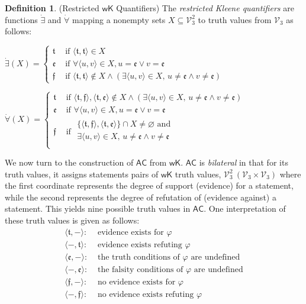 \documentclass[letterpaper]{article} %
\theoremstyle{definition}
\theoremstyle{definition}
\newtheorem{definition}{Definition}
\theoremstyle{definition}
\theoremstyle{definition}
\theoremstyle{definition}
\newcommand{\vt}{\mathfrak{t}}
\newcommand{\vf}{\mathfrak{f}}
\newcommand{\vu}{\mathfrak{e}}
\begin{document}
\begin{definition}(Restricted $\mathsf{wK}$ Quantifiers)
    The \emph{restricted Kleene quantifiers} are functions $\dot{\exists}$ and $\dot{\forall}$ mapping a nonempty sets $X\subseteq\mathcal{V}_{3}^{2}$ to truth values from $\mathcal{V}_{3}$ as follows:
	
	\vspace{.1cm}

    {\small
	
	\noindent $\dot{\exists}(X)=\begin{cases}
	\vt & \mbox{ if }\langle\vt,\vt\rangle\in X\\
	\vu & \mbox{ if }\forall\langle u,v\rangle\in X, u=\vu\lor v=\vu\\
	\vf & \mbox{ if }\langle\vt,\vt\rangle\notin X \land (\exists \langle u,v\rangle\in X\mbox{, }u\neq\vu\land v\neq\vu)
	\end{cases}$

    	\noindent $\dot{\forall}(X)=\begin{cases}
	\vt & \mbox{ if }\langle\vt,\vf\rangle,\langle\vt,\vu\rangle\notin X \land (\exists \langle u,v\rangle\in X\mbox{, }u\neq\vu\land v\neq\vu)\\
	\vu & \mbox{ if } \forall\langle u,v\rangle\in X,u=\vu\lor v=\vu\\
	\vf & \mbox{ if }
    \begin{aligned}
    \lbrace\langle\vt,\vf\rangle,\langle\vt,\vu\rangle\rbrace\cap X\neq\varnothing \mbox{ and }\\ \exists \langle u,v\rangle\in X\mbox{, }u\neq\vu\land v\neq\vu\\
    \end{aligned}
	\end{cases}$
    }
\end{definition}
\noindent We now turn to the construction of $\mathsf{AC}$ from $\mathsf{wK}$. $\mathsf{AC}$ is \textit{bilateral} in that for its truth values, it assigns statements pairs of $\mathsf{wK}$ truth values, $\mathcal{V}^2_3 \: (\mathcal{V}_3 \times \mathcal{V}_3)$ where the first coordinate represents the degree of support (evidence) for a statement, while the second represents the degree of refutation of (evidence against) a statement. This yields nine possible truth values in $\mathsf{AC}$. One interpretation of these truth values is given as follows:
\begin{align*} \langle\vt,-\rangle: & \text{ evidence exists for } \varphi \\ 
\langle -,\vt\rangle: & \text{ evidence exists refuting } \varphi \\ 
\langle\vu,-\rangle: & \text{ the truth conditions of } \varphi \text{ are undefined} \\
\langle -,\vu\rangle: & \text{ the falsity conditions of } \varphi \text{ are undefined} \\ 
\langle\vf,-\rangle: & \text{ no evidence exists for } \varphi \\
\langle -,\vf\rangle: & \text{ no evidence exists refuting } \varphi 
\end{align*}
\end{document}
